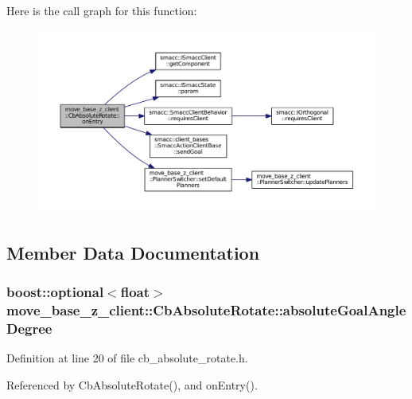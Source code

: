 Here is the call graph for this function\+:
\nopagebreak
\begin{figure}[H]
\begin{center}
\leavevmode
\includegraphics[width=350pt]{classmove__base__z__client_1_1CbAbsoluteRotate_ab5537a52d9ddb242be60e6f9e0b231af_cgraph}
\end{center}
\end{figure}




\subsection{Member Data Documentation}
\subsubsection[{\texorpdfstring{absolute\+Goal\+Angle\+Degree}{absoluteGoalAngleDegree}}]{\setlength{\rightskip}{0pt plus 5cm}boost\+::optional$<$float$>$ move\+\_\+base\+\_\+z\+\_\+client\+::\+Cb\+Absolute\+Rotate\+::absolute\+Goal\+Angle\+Degree}\hypertarget{classmove__base__z__client_1_1CbAbsoluteRotate_a3732ce20b520f9df9408f849ff809a19}{}\label{classmove__base__z__client_1_1CbAbsoluteRotate_a3732ce20b520f9df9408f849ff809a19}


Definition at line 20 of file cb\+\_\+absolute\+\_\+rotate.\+h.



Referenced by Cb\+Absolute\+Rotate(), and on\+Entry().

